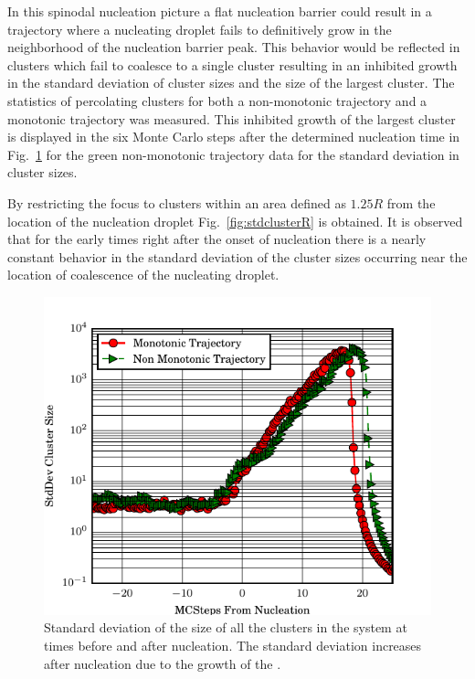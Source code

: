 In this spinodal nucleation picture a flat nucleation barrier could result in a trajectory where a nucleating droplet fails to definitively grow in the neighborhood of the nucleation barrier peak. This behavior would be reflected in clusters which fail to coalesce to a single cluster resulting in an inhibited growth in the standard deviation of cluster sizes and the size of the largest cluster. The statistics of percolating clusters for both a non-monotonic trajectory and a monotonic trajectory was measured. This inhibited growth of the largest cluster is displayed in the six Monte Carlo steps after the determined nucleation time in Fig.~\ref{fig:stdcluster} for the green non-monotonic trajectory data for the standard deviation in cluster sizes. %


By restricting the focus to clusters within an area defined as $1.25R$   from the location of the nucleation droplet Fig.~\ref{fig:stdclusterR} is obtained. It is observed that for the early times right after the onset of nucleation there is a nearly constant behavior in the standard deviation of the cluster sizes occurring near the location of coalescence of the nucleating droplet.  %
\begin{figure}[!h]
    \centering
      \includegraphics[scale=1.1]{Figures/intervention_ising/stdCluster-.pdf}
    \caption{Standard deviation of the size of all the clusters in the system at times before and after nucleation. The standard deviation increases after nucleation due to the growth of the \nd.}
  \label{fig:stdcluster}
\end{figure}%
